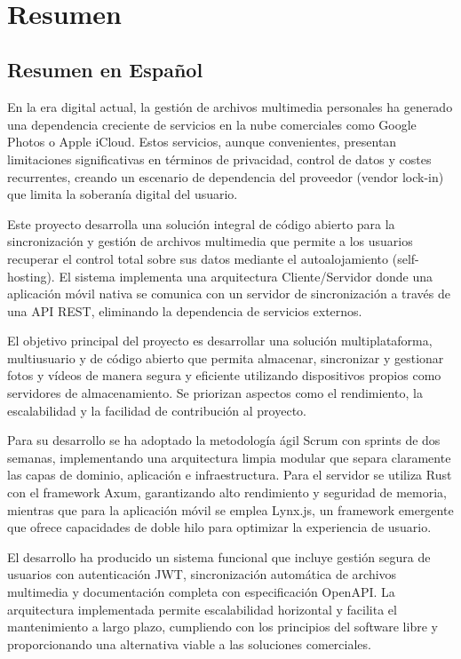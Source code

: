 \newpage
~
\newpage
\chapter*{Resumen}

\section*{Resumen en Español}

En la era digital actual, la gestión de archivos multimedia personales ha generado una dependencia creciente de servicios en la nube comerciales como Google Photos o Apple iCloud. Estos servicios, aunque convenientes, presentan limitaciones significativas en términos de privacidad, control de datos y costes recurrentes, creando un escenario de dependencia del proveedor (vendor lock-in) que limita la soberanía digital del usuario.

Este proyecto desarrolla una solución integral de código abierto para la sincronización y gestión de archivos multimedia que permite a los usuarios recuperar el control total sobre sus datos mediante el autoalojamiento (self-hosting). El sistema implementa una arquitectura Cliente/Servidor donde una aplicación móvil nativa se comunica con un servidor de sincronización a través de una API REST, eliminando la dependencia de servicios externos.

El objetivo principal del proyecto es desarrollar una solución multiplataforma, multiusuario y de código abierto que permita almacenar, sincronizar y gestionar fotos y vídeos de manera segura y eficiente utilizando dispositivos propios como servidores de almacenamiento. Se priorizan aspectos como el rendimiento, la escalabilidad y la facilidad de contribución al proyecto.

Para su desarrollo se ha adoptado la metodología ágil Scrum con sprints de dos semanas, implementando una arquitectura limpia modular que separa claramente las capas de dominio, aplicación e infraestructura. Para el servidor se utiliza Rust con el framework Axum, garantizando alto rendimiento y seguridad de memoria, mientras que para la aplicación móvil se emplea Lynx.js, un framework emergente que ofrece capacidades de doble hilo para optimizar la experiencia de usuario.

El desarrollo ha producido un sistema funcional que incluye gestión segura de usuarios con autenticación JWT, sincronización automática de archivos multimedia y documentación completa con especificación OpenAPI. La arquitectura implementada permite escalabilidad horizontal y facilita el mantenimiento a largo plazo, cumpliendo con los principios del software libre y proporcionando una alternativa viable a las soluciones comerciales.

